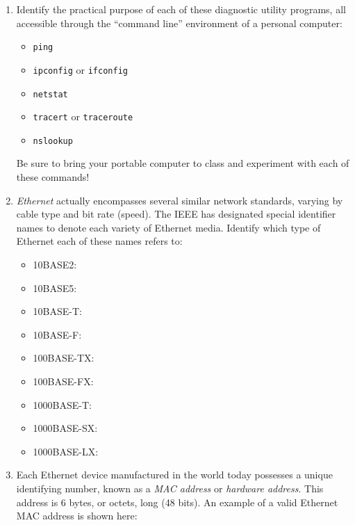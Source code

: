 \begin{enumerate}



\item Identify the practical purpose of each of these diagnostic utility programs, all accessible through the ``command line'' environment of a personal computer:

\begin{itemize}
\item{} {\tt ping}
\vskip 10pt
\item{} {\tt ipconfig} or {\tt ifconfig}
\vskip 10pt
\item{} {\tt netstat}
\vskip 10pt
\item{} {\tt tracert} or {\tt traceroute}
\vskip 10pt
\item{} {\tt nslookup}
\end{itemize}

Be sure to bring your portable computer to class and experiment with each of these commands!


\item {\it Ethernet} actually encompasses several similar network standards, varying by cable type and bit rate (speed).  The IEEE has designated special identifier names to denote each variety of Ethernet media.  Identify which type of Ethernet each of these names refers to:

\begin{itemize}
\item{} 10BASE2:
\vskip 5pt
\item{} 10BASE5:
\vskip 5pt
\item{} 10BASE-T:
\vskip 5pt
\item{} 10BASE-F:
\vskip 5pt
\item{} 100BASE-TX:
\vskip 5pt
\item{} 100BASE-FX:
\vskip 5pt
\item{} 1000BASE-T:
\vskip 5pt
\item{} 1000BASE-SX:
\vskip 5pt
\item{} 1000BASE-LX:
\end{itemize}


\item Each Ethernet device manufactured in the world today possesses a unique identifying number, known as a {\it MAC address} or {\it hardware address}.  This address is 6 bytes, or octets, long (48 bits).  An example of a valid Ethernet MAC address is shown here:


\end{enumerate}
